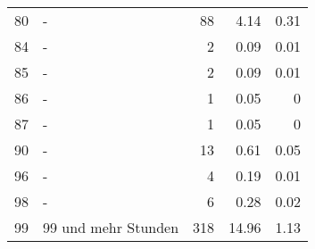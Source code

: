 \begin{longtable}{lXrrr}
        80 & \multicolumn{1}{X}{-} & %
          \num{88} &
          \num[round-mode=places,round-precision=2]{4,14} &
          \num[round-mode=places,round-precision=2]{0,31} \\

        84 & \multicolumn{1}{X}{-} & %
          \num{2} &
          \num[round-mode=places,round-precision=2]{0,09} &
          \num[round-mode=places,round-precision=2]{0,01} \\

        85 & \multicolumn{1}{X}{-} & %
          \num{2} &
          \num[round-mode=places,round-precision=2]{0,09} &
          \num[round-mode=places,round-precision=2]{0,01} \\

        86 & \multicolumn{1}{X}{-} & %
          \num{1} &
          \num[round-mode=places,round-precision=2]{0,05} &
          \num[round-mode=places,round-precision=2]{0} \\

        87 & \multicolumn{1}{X}{-} & %
          \num{1} &
          \num[round-mode=places,round-precision=2]{0,05} &
          \num[round-mode=places,round-precision=2]{0} \\

        90 & \multicolumn{1}{X}{-} & %
          \num{13} &
          \num[round-mode=places,round-precision=2]{0,61} &
          \num[round-mode=places,round-precision=2]{0,05} \\

        96 & \multicolumn{1}{X}{-} & %
          \num{4} &
          \num[round-mode=places,round-precision=2]{0,19} &
          \num[round-mode=places,round-precision=2]{0,01} \\

        98 & \multicolumn{1}{X}{-} & %
          \num{6} &
          \num[round-mode=places,round-precision=2]{0,28} &
          \num[round-mode=places,round-precision=2]{0,02} \\

        99 & \multicolumn{1}{X}{99 und mehr Stunden} & %
          \num{318} &
          \num[round-mode=places,round-precision=2]{14,96} &
          \num[round-mode=places,round-precision=2]{1,13} \\


\end{longtable}
